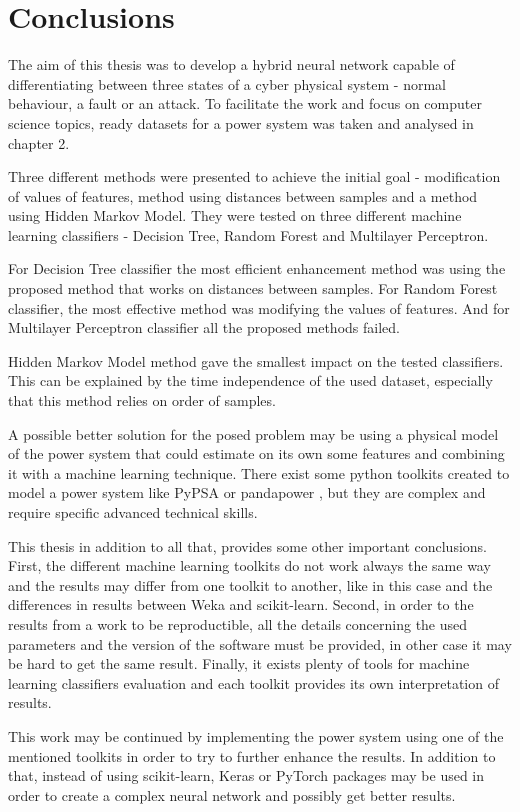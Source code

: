 \chapter{Conclusions}

The aim of this thesis was to develop a hybrid neural network capable of differentiating between three states of a cyber physical system - normal behaviour, a fault or an attack. To facilitate the work and focus on computer science topics, ready datasets for a power system was taken and analysed in chapter 2. 

Three different methods were presented to achieve the initial goal - modification of values of features, method using distances between samples and a method using Hidden Markov Model. They were tested on three different machine learning classifiers - Decision Tree, Random Forest and Multilayer Perceptron. 

For Decision Tree classifier the most efficient enhancement method was using the proposed method that works on distances between samples. For Random Forest classifier, the most effective method was modifying the values of features. And for Multilayer Perceptron classifier all the proposed methods failed.

Hidden Markov Model method gave the smallest impact on the tested classifiers. This can be explained by the time independence of the used dataset, especially that this method relies on order of samples.

A possible better solution for the posed problem may be using a physical model of the power system that could estimate on its own some features and combining it with a machine learning technique. There exist some python toolkits created to model a power system like PyPSA \cite{brown_pypsapypsa_2020} or pandapower \cite{noauthor_pandapower_nodate}, but they are complex and require specific advanced technical skills.

This thesis in addition to all that, provides some other important conclusions. First, the different machine learning toolkits do not work always the same way and the results may differ from one toolkit to another, like in this case and the differences in results between Weka and scikit-learn. Second, in order to the results from a work to be reproductible, all the details concerning the used parameters and the version of the software must be provided, in other case it may be hard to get the same result. Finally, it exists plenty of tools for machine learning classifiers evaluation and each toolkit provides its own interpretation of results.

This work may be continued by implementing the power system using one of the mentioned toolkits in order to try to further enhance the results. In addition to that, instead of using scikit-learn, Keras \cite{noauthor_keras_nodate} or PyTorch \cite{noauthor_pytorch_nodate} packages may be used in order to create a complex neural network and possibly get better results.   